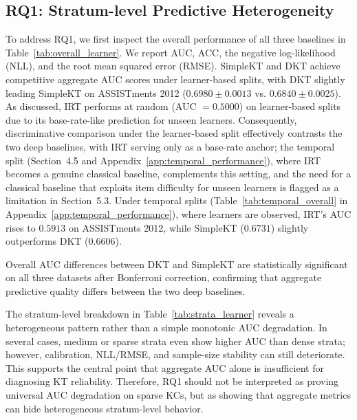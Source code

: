 \subsection{RQ1: Stratum-level Predictive Heterogeneity}
To address RQ1, we first inspect the overall performance of all three baselines in Table~\ref{tab:overall_learner}. We report AUC, ACC, the negative log-likelihood (NLL), and the root mean squared error (RMSE). SimpleKT and DKT achieve competitive aggregate AUC scores under learner-based splits, with DKT slightly leading SimpleKT on ASSISTments 2012 ($0.6980 \pm 0.0013$ vs. $0.6840 \pm 0.0025$). As discussed, IRT performs at random (AUC $= 0.5000$) on learner-based splits due to its base-rate-like prediction for unseen learners. Consequently, discriminative comparison under the learner-based split effectively contrasts the two deep baselines, with IRT serving only as a base-rate anchor; the temporal split (Section~4.5 and Appendix~\ref{app:temporal_performance}), where IRT becomes a genuine classical baseline, complements this setting, and the need for a classical baseline that exploits item difficulty for unseen learners is flagged as a limitation in Section~5.3. Under temporal splits (Table~\ref{tab:temporal_overall} in Appendix~\ref{app:temporal_performance}), where learners are observed, IRT's AUC rises to $0.5913$ on ASSISTments 2012, while SimpleKT ($0.6731$) slightly outperforms DKT ($0.6606$).





Overall AUC differences between DKT and SimpleKT are statistically significant on all three datasets after Bonferroni correction, confirming that aggregate predictive quality differs between the two deep baselines.

The stratum-level breakdown in Table~\ref{tab:strata_learner} reveals a heterogeneous pattern rather than a simple monotonic AUC degradation. In several cases, medium or sparse strata even show higher AUC than dense strata; however, calibration, NLL/RMSE, and sample-size stability can still deteriorate. This supports the central point that aggregate AUC alone is insufficient for diagnosing KT reliability. Therefore, RQ1 should not be interpreted as proving universal AUC degradation on sparse KCs, but as showing that aggregate metrics can hide heterogeneous stratum-level behavior.



